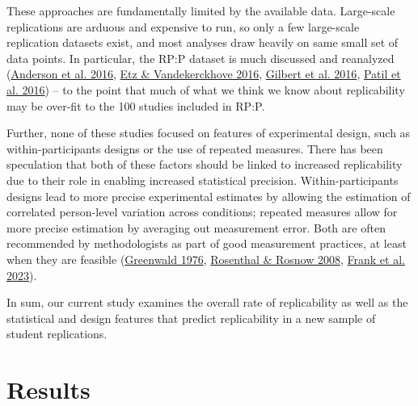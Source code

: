 \documentclass[
  english,
  a4paper,
]{article}
\begin{document}
These approaches are fundamentally limited by the available data. Large-scale replications are arduous and expensive to run, so only a few large-scale replication datasets exist, and most analyses draw heavily on same small set of data points. In particular, the RP:P dataset is much discussed and reanalyzed (\protect\hyperlink{ref-anderson2016}{Anderson et al. 2016}, \protect\hyperlink{ref-etz2016}{Etz \& Vandekerckhove 2016}, \protect\hyperlink{ref-gilbert2016}{Gilbert et al. 2016}, \protect\hyperlink{ref-patil2016}{Patil et al. 2016}) -- to the point that much of what we think we know about replicability may be over-fit to the 100 studies included in RP:P.

Further, none of these studies focused on features of experimental design, such as within-participants designs or the use of repeated measures. There has been speculation that both of these factors should be linked to increased replicability due to their role in enabling increased statistical precision. Within-participants designs lead to more precise experimental estimates by allowing the estimation of correlated person-level variation across conditions; repeated measures allow for more precise estimation by averaging out measurement error. Both are often recommended by methodologists as part of good measurement practices, at least when they are feasible (\protect\hyperlink{ref-greenwald1976}{Greenwald 1976}, \protect\hyperlink{ref-rosenthal2008}{Rosenthal \& Rosnow 2008}, \protect\hyperlink{ref-frank2023}{Frank et al. 2023}).

In sum, our current study examines the overall rate of replicability as well as the statistical and design features that predict replicability in a new sample of student replications.

\hypertarget{results}{%
\section{Results}\label{results}}

    
\end{document}
